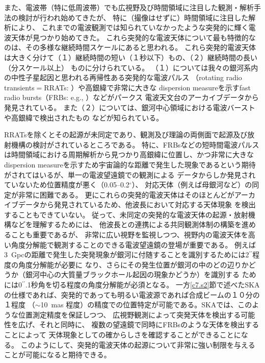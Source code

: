 また、電波帯（特に低周波帯）でも広視野及び時間領域に注目した観測・解析手法の検討が行われ始めてきたが、
特に（撮像はせずに）時間領域に注目した解析により、
これまでの電波観測では知られていなかったような突発的に輝く電波天体が見つかり始めてきた。
これら突発的な電波天体について最も特徴的なのは、その多様な継続時間スケールにあると思われる。
これら突発的電波天体は大きく分けて（１）継続時間の短い（１秒以下）もの、（２）継続時間の長い（分スケール以上）
ものに分けられている。
（１）については我々の銀河系内の中性子星起因と思われる再帰性ある突発的な電波パルス
（rotating radio transients$=$RRATs: \citealt{2006Natur.439..817M}）や高銀緯で非常に大きな
dispersion measureを示すfast radio bursts（FRBs: e.g., \citealt{2007Sci...318..777L}）などがパークス
電波天文台のアーカイブデータから発見されている。
また（２）については、銀河中心領域における電波バースト\citep{2005Natur.434...50H} や高銀緯で検出されたもの
\citep{2012AJ....143...96J}などが知られている。

RRATsを除くとその起源が未同定であり、観測及び理論の両側面で起源及び放射機構の検討がされているところである。
特に、FRBsなどの短時間電波パルスは時間領域における周期解析から見つかり高銀緯に位置し、かつ非常に大きなdispersion 
measureを示すため宇宙論的な距離で発生した現象であるという期待がされてはいるが、単一の電波望遠鏡での観測による
データからしか発見されていないため位置精度が悪く（0.05--0.2$^{\circ}$）、
対応天体（例えば母銀河など）の同定が非常に困難である。
%
更にこれらの突発的電波天体はそのほとんどがアーカイブデータから発見されているため、他波長において対応する天体現象
を検出することもできていない。
%
従って、未同定の突発的な電波天体の起源・放射機構などを理解するためには、
他波長との連携による共同観測体制の構築を進めることも重要であるが、
非常に広い視野を監視しつつ、視野内の電波天体を高い角度分解能で観測することのできる電波望遠鏡の登場が重要である。
%
例えば3~Gpcの距離で発生した突発現象が銀河に付随することを識別するためには2$^{\prime\prime}$程度の角度分解能が必要に
なり、さらにその発生位置が銀河の中のどの辺りかどうか（銀河中心の大質量ブラックホール起因の現象かどうか）を識別する
ためには0$^{\prime\prime}$\hspace{-2pt}.1秒角を切る程度の角度分解能が必須となる。
一方\ref{c7.s2}節で述べたSKAの仕様であれば、突発的であっても明るい電波源であれば合成ビームの１０分の１程度
（$\sim$10~mas 程度）の精度での位置特定が可能である。SKAでは、このような位置測定精度を保証しつつ、
広視野観測によって突発天体を検出する可能性を広げ、それと同時に、
複数の望遠鏡で同時にFRBsのような天体を検出することによって
天体現象としての確からしさを確認することができることになる。
このようにして、突発的電波天体の起源について非常に強い制限を与えることが可能になると期待できる。

